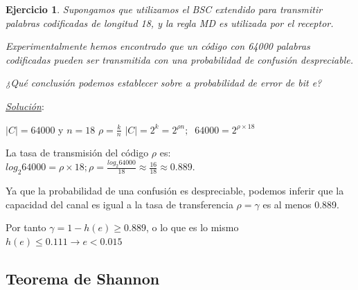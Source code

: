 \documentclass{beamer}
\theoremstyle{plain}
\theoremstyle{example}
\newtheorem{ejercicio} [Ejercicio]{Ejercicio}
\theoremstyle{example}
\begin{document}
\begin{frame}  \small \begin{ejercicio} 

Supongamos que utilizamos el BSC extendido para transmitir palabras codificadas de longitud 18, y la regla MD es utilizada por el receptor. 

Experimentalmente hemos encontrado que un código con 64000 palabras codificadas pueden ser transmitida con una probabilidad de confusión despreciable. 
\vspace{0.2cm}

¿Qué conclusión podemos establecer sobre a probabilidad de error de bit e?


\end{ejercicio}  \textit{\underline{Solución}}:\\ 
\vspace{0.2cm}

$|C| = 64000$ y $n = 18 $ $\rho = \frac{k}{n}$ $|C| = 2^k = 2^{\rho n} ;\;\; 64000 =  2^{\rho \times 18}$
\vspace{0.2cm}


La tasa de transmisión del código $\rho$ es:\\
\vspace{0.1cm}
$log_2 64000 = \rho \times 18 ; \rho = \frac{log_2 64000}{18}   \approx \frac{16}{18} \approx 0.889$. \\

\vspace{0.2cm}

Ya que la probabilidad de una confusión es despreciable, podemos inferir que la capacidad del canal es igual a la tasa de transferencia $\rho = \gamma$ es al menos 0.889. 

\vspace{0.2cm}

Por tanto $\gamma = 1-h(e) \geq 0.889$, o lo que es lo mismo $h(e)\leq 0.111 \rightarrow e < 0.015$


\end{frame} 




\subsection{Teorema de Shannon}
\end{document}
